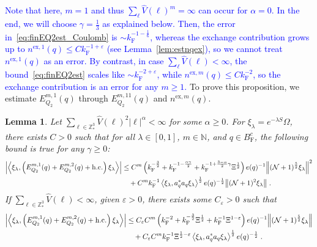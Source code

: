\documentclass[12pt,a4paper]{article}
\numberwithin{equation}{section}
\newcommand{\NNN}{\mathbb{N}}
\newcommand{\1}{\mathbb{I}}
\newcommand{\ex}{\mathrm{ex}}
\newcommand{\F}{\mathrm{F}}
\newcommand{\Z}{\mathbb{Z}}
\newcommand{\NN}{\mathcal{N}}
\newcommand{\half}{\frac{1}{2}}
\newcommand{\eva}[1]{\left\langle #1 \right\rangle}
\theoremstyle{plain}
\newtheorem{lemma}[theorem]{Lemma}
\theoremstyle{definition}
\theoremstyle{remark}
\theoremstyle{plain}
\theoremstyle{definition}
\theoremstyle{remark}
\begin{document}
\textcolor{blue}{
Note that here, $ m = 1 $ and thus $ \sum_\ell \hat{V}(\ell)^m = \infty $ can occur for $ \alpha = 0 $. In the end, we will choose $ \gamma = \frac 13 $ as explained below. Then, the error in~\eqref{eq:finEQ2est_Coulomb} is $ \sim k_{\F}^{-1-\frac 16} $, whereas the exchange contribution grows up to $ n^{\ex,1}(q) \le C k_{\F}^{-1 + \varepsilon} $ (see Lemma~\ref{lem:estnqex}), so we cannot treat $ n^{\ex,1}(q) $ as an error. By contrast, in case $ \sum_\ell \hat{V}(\ell) < \infty $, the bound~\eqref{eq:finEQ2est} scales like $ \sim k_{\F}^{-2+\varepsilon} $, while $ n^{\ex,m}(q) \le C k_{\F}^{-2} $, so the exchange contribution is an error for any $ m \ge 1 $.
}
To prove this proposition, we estimate $ E^{m,1}_{Q_2}(q) $ through $ E^{m,11}_{Q_2} (q)$ and $ n^{\ex,m}(q) $.

\begin{lemma} \label{lem:EQ211}
Let $ \sum_{\ell \in \Z^3_*} \hat{V}(\ell)^2 |\ell|^\alpha < \infty $ for some $ \alpha \ge 0 $. For $\xi_\lambda = e^{-\lambda S} \Omega$, there exists $ C > 0 $ such that for all $ \lambda \in [0,1] $, $ m \in \NNN $, and $ q \in B_{\F}^c $, the following bound is true for any $ \gamma \ge 0 $:
\begin{align}
	\abs{\eva{\xi_\lambda,\left(E^{m,1}_{Q_2}(q) + E^{m,2}_{Q_2}(q) + \mathrm{h.c.}\right) \xi_\lambda }}
	&\leq C^m \left( k_{\F}^{-\frac 32}
		+ k_{\F}^{-1-\frac{\alpha \gamma}{2}} 
		+ k_{\F}^{-1+ \frac{3-\alpha}{2} \gamma} \Xi^{\half} \right) e(q)^{-1}
		\norm{ (\NN+1)^{\frac 52} \xi_\lambda }^2 \nonumber\\
	&\quad + C^m k_{\F}^{-1} \eva{\xi_\lambda, a_q^* a_q \xi_\lambda}^{\half} e(q)^{-\half} \norm{ (\NN+1)^2 \xi_\lambda } \;. \label{eq:estEQ211_Coulomb}
\end{align}
If $ \sum_{\ell \in \Z^3_*} \hat{V}(\ell) < \infty $, given $ \varepsilon > 0 $, there exists some $ C_\varepsilon > 0 $ such that
\begin{align}
	\abs{\eva{\xi_\lambda,\left(E^{m,1}_{Q_2}(q) + E^{m,2}_{Q_2}(q) + \mathrm{h.c.}\right) \xi_\lambda }}
	&\leq C_\varepsilon C^m \left( k_{\F}^{-2}
		+ k_{\F}^{-\frac{3}{2}} \Xi^\half 
		+ k_{\F}^{-1}\Xi^{1-\varepsilon} \right) e(q)^{-1} 
		\norm { (\NN+1)^{\frac 52} \xi_\lambda } \nonumber\\
	&\quad + C_\varepsilon C^m k_{\F}^{-1} \Xi^{\half - \varepsilon} \eva{\xi_\lambda, a_q^* a_q \xi_\lambda}^{\half} e(q)^{-\half} \;. \label{eq:estEQ211}
\end{align}
\end{lemma}
\end{document}
